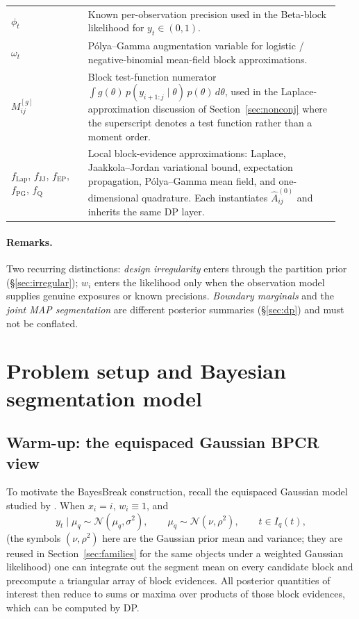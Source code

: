 \begin{longtable}{@{}p{0.22\linewidth}p{0.72\linewidth}@{}}
$\phi_t$ & Known per-observation precision used in the Beta-block likelihood for $y_t\in(0,1)$. \\
$\omega_t$ & P\'olya--Gamma augmentation variable for logistic / negative-binomial mean-field block approximations. \\
$M^{[g]}_{ij}$ & Block test-function numerator $\int g(\theta)\, p(y_{i+1:j}\mid \theta)\, p(\theta)\, d\theta$, used in the Laplace-approximation discussion of Section~\ref{sec:nonconj} where the superscript denotes a test function rather than a moment order. \\
\midrule
$f_{\mathrm{Lap}}$, $f_{\mathrm{JJ}}$, $f_{\mathrm{EP}}$, $f_{\mathrm{PG}}$, $f_{\mathrm{Q}}$ & Local block-evidence approximations:
Laplace, Jaakkola--Jordan variational bound, expectation propagation, P\'olya--Gamma mean field,
and one-dimensional quadrature. Each instantiates $\widehat A^{(0)}_{ij}$ and inherits the same DP layer. \\
\bottomrule
\end{longtable}

\paragraph{Remarks.}
Two recurring distinctions: \emph{design irregularity} enters through the partition prior
(\S\ref{sec:irregular}); $w_i$ enters the likelihood only when the observation model supplies
genuine exposures or known precisions. \emph{Boundary marginals} and the \emph{joint MAP
segmentation} are different posterior summaries (\S\ref{sec:dp}) and must not be conflated.

\section{Problem setup and Bayesian segmentation model}
\label{sec:setup}

\subsection{Warm-up: the equispaced Gaussian BPCR view}
To motivate the BayesBreak construction, recall the equispaced Gaussian model studied by
\citet{hutter2006bpcr}. When $x_i=i$, $w_i\equiv 1$, and
\[
y_t\mid \mu_q \sim \mathcal{N}(\mu_q,\sigma^2),
\qquad
\mu_q\sim \mathcal{N}(\nu,\rho^2),
\qquad t\in I_q(t),
\]
(the symbols $(\nu,\rho^2)$ here are the Gaussian prior mean and variance; they are reused in
Section~\ref{sec:families} for the same objects under a weighted Gaussian likelihood)
one can integrate out the segment mean on every candidate block and precompute a triangular array
of block evidences. All posterior quantities of interest then reduce to sums or maxima over
products of those block evidences, which can be computed by DP.

